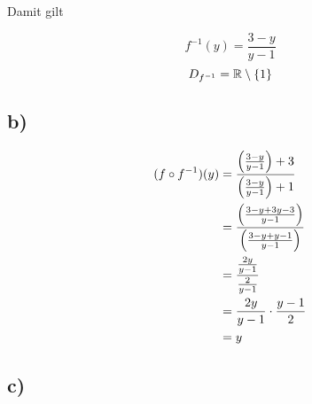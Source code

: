 \documentclass[a4paper, 11pt]{article}
\begin{document}
Damit gilt

$$ f^{-1}(y) = \frac{3-y}{y-1} $$
$$ D_{f^{-1}} = \mathbb{R} \setminus \{1\} $$

\subsection{b)}
\label{sec:orga2f4312}
\begin{align*}
    (f \circ f^{-1})(y) &= \frac{\left(\frac{3-y}{y-1}\right)+3}{\left(\frac{3-y}{y-1}\right)+1} \\
    &= \frac{\left(\frac{3-y + 3y-3}{y-1}\right)}{\left(\frac{3-y + y-1}{y-1}\right)} \\
    &= \frac{\frac{2y}{y-1}}{\frac{2}{y-1}} \\
    &= \frac{2y}{y-1} \cdot \frac{y-1}{2} \\
    &= y \\
\end{align*}

\subsection{c)}
\label{sec:orga7b5116}
\end{document}
